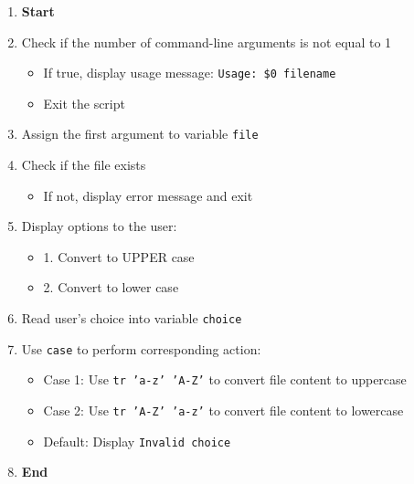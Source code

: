 \begin{enumerate}
    \item \textbf{Start}
    \item Check if the number of command-line arguments is not equal to 1
    \begin{itemize}
        \item If true, display usage message: \texttt{Usage: \$0 filename}
        \item Exit the script
    \end{itemize}
    \item Assign the first argument to variable \texttt{file}
    \item Check if the file exists
    \begin{itemize}
        \item If not, display error message and exit
    \end{itemize}
    \item Display options to the user:
    \begin{itemize}
        \item 1. Convert to UPPER case
        \item 2. Convert to lower case
    \end{itemize}
    \item Read user's choice into variable \texttt{choice}
    \item Use \texttt{case} to perform corresponding action:
    \begin{itemize}
        \item Case 1: Use \texttt{tr 'a-z' 'A-Z'} to convert file content to uppercase
        \item Case 2: Use \texttt{tr 'A-Z' 'a-z'} to convert file content to lowercase
        \item Default: Display \texttt{Invalid choice}
    \end{itemize}
    \item \textbf{End}
\end{enumerate}

